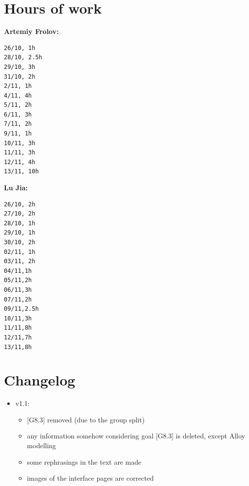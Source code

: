 \documentclass[12pt, letterpaper]{article}
\begin{document}
\section{Hours of work}
\textbf{Artemiy Frolov:}
\begin{verbatim}
26/10, 1h 
28/10, 2.5h 
29/10, 3h 
31/10, 2h 
2/11, 1h
4/11, 4h
5/11, 2h
6/11, 3h
7/11, 2h
9/11, 1h
10/11, 3h
11/11, 3h
12/11, 4h
13/11, 10h
\end{verbatim}
\vspace{0.5cm}
\textbf{Lu Jia:}
\begin{verbatim}
26/10, 2h
27/10, 2h
28/10, 1h
29/10, 1h
30/10, 2h
02/11, 1h
03/11, 2h
04/11,1h
05/11,2h
06/11,3h
07/11,2h
09/11,2.5h
10/11,3h
11/11,8h
12/11,7h
13/11,8h
\end{verbatim}
\newpage

\section{Changelog}

\begin{itemize}
	\item v1.1:
	\begin{itemize}
		\item {[G8.3]} removed (due to the group split) 
		\item any information somehow considering goal {[G8.3]} is deleted, except Alloy modelling
		\item some rephrasings in the text are made
		\item images of the interface pages are corrected
	\end{itemize}
\end{itemize}
\end{document}
